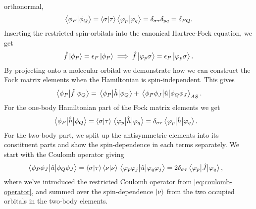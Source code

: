             orthonormal,
            \begin{align}
                \braket{\phi_P}{\phi_Q}
                = \braket{\sigma}{\tau}
                \braket{\varphi_p}{\varphi_q}
                = \delta_{\sigma \tau}
                \delta_{pq}
                = \delta_{PQ}.
            \end{align}
            Inserting the restricted spin-orbitals into the canonical
            Hartree-Fock equation, we get
            \begin{align}
                \hat{f}\ket{\phi_P} = \epsilon_P\ket{\phi_P}
                \implies
                \hat{f}\ket{\varphi_p\sigma}
                = \epsilon_P\ket{\varphi_p\sigma}.
            \end{align}
            By projecting onto a molecular orbital we demonstrate how we can
            construct the Fock matrix elements when the Hamiltonian is
            spin-independent.
            This gives
            \begin{align}
                \mel{\phi_P}{\hat{f}}{\phi_Q}
                = \mel{\phi_P}{\hat{h}}{\phi_Q}
                + \mel{\phi_P\phi_J}{\hat{u}}{\phi_Q\phi_J}_{AS}.
                \label{eq:mo-fock-elements}
            \end{align}
            For the one-body Hamiltonian part of the Fock matrix elements we get
            \begin{align}
                \mel{\phi_P}{\hat{h}}{\phi_Q}
                &= \braket{\sigma}{\tau}\mel{\varphi_p}{\hat{h}}{\varphi_q}
                = \delta_{\sigma\tau}\mel{\varphi_p}{\hat{h}}{\varphi_q}.
            \end{align}
            For the two-body part, we split up the antisymmetric elements into
            its constituent parts and show the spin-dependence in each terms
            separately.
            We start with the Coulomb operator giving
            \begin{align}
                \mel{\phi_P\phi_J}{\hat{u}}{\phi_Q\phi_J}
                &= \braket{\sigma}{\tau}\braket{\nu}{\nu}
                \mel{\varphi_p\varphi_j}{\hat{u}}{\varphi_q\varphi_j}
                = 2 \delta_{\sigma\tau}
                \mel{\varphi_p}{\hat{J}}{\varphi_q},
            \end{align}
            where we've introduced the restricted Coulomb operator from
            \autoref{eq:coulomb-operator}, and summed over the spin-dependence
            $\ket{\nu}$ from the two occupied orbitals in the two-body elements.
